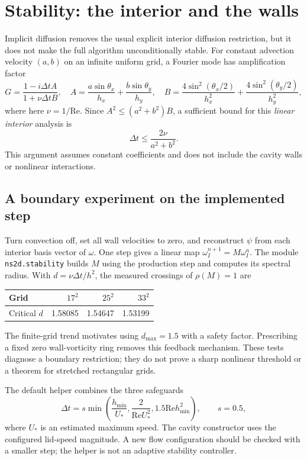 \documentclass[11pt,a4paper]{article}
\newcommand{\Rey}{\mathrm{Re}}
\newcommand{\dt}{\Delta t}
\newcommand{\code}[1]{\texttt{#1}}
\begin{document}
\section{Stability: the interior and the walls}
Implicit diffusion removes the usual explicit interior diffusion restriction,
but it does not make the full algorithm unconditionally stable.
For constant advection velocity $(a,b)$ on an infinite uniform grid, a Fourier
mode has amplification factor
\begin{equation}
G=\frac{1-i\dt A}{1+\nu\dt B},\quad
A=\frac{a\sin\theta_x}{h_x}+\frac{b\sin\theta_y}{h_y},\quad
B=\frac{4\sin^2(\theta_x/2)}{h_x^2}
+\frac{4\sin^2(\theta_y/2)}{h_y^2},
\end{equation}
where here $\nu=1/\Rey$. Since $A^2\leq(a^2+b^2)B$, a sufficient bound for
this \emph{linear interior} analysis is
\begin{equation}
\dt\leq\frac{2\nu}{a^2+b^2}.
\end{equation}
This argument assumes constant coefficients and does not include the cavity
walls or nonlinear interactions.

\subsection{A boundary experiment on the implemented step}
Turn convection off, set all wall velocities to zero, and reconstruct $\psi$
from each interior basis vector of $\omega$. One step gives a linear map
$\omega_I^{n+1}=M\omega_I^n$. The module \code{ns2d.stability} builds $M$ using
the production step and computes its spectral radius. With
$d=\nu\dt/h^2$, the measured crossings of $\rho(M)=1$ are
\begin{center}
\begin{tabular}{@{}lrrr@{}}\toprule
Grid & $17^2$ & $25^2$ & $33^2$\\\midrule
Critical $d$ & 1.58085 & 1.54647 & 1.53199\\\bottomrule
\end{tabular}
\end{center}
The finite-grid trend motivates using $d_{\max}=1.5$ with a safety factor.
Prescribing a fixed zero wall-vorticity ring removes this feedback mechanism.
These tests diagnose a boundary restriction; they do not prove a sharp
nonlinear threshold or a theorem for stretched rectangular grids.

The default helper combines the three safeguards
\begin{equation}
\dt=s\min\!\left(\frac{h_{\min}}{U_*},\frac{2}{\Rey U_*^2},
1.5\Rey h_{\min}^2\right),\qquad s=0.5,
\end{equation}
where $U_*$ is an estimated maximum speed. The cavity constructor uses the
configured lid-speed magnitude. A new flow configuration should be checked
with a smaller step; the helper is not an adaptive stability controller.
\end{document}
